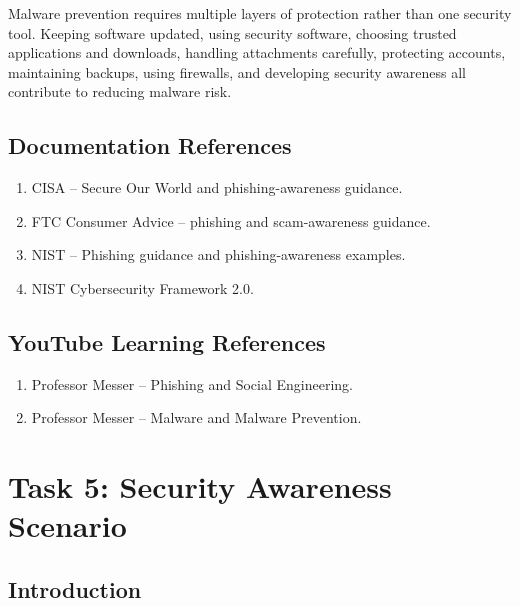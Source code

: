 \documentclass[12pt,a4paper]{article}
\begin{document}
Malware prevention requires multiple layers of protection rather than
one security tool. Keeping software updated, using security software,
choosing trusted applications and downloads, handling attachments
carefully, protecting accounts, maintaining backups, using firewalls,
and developing security awareness all contribute to reducing malware
risk.


\Needspace{5cm}
\subsection{Documentation References}

\begin{enumerate}
    \item CISA -- Secure Our World and phishing-awareness guidance.
    \item FTC Consumer Advice -- phishing and scam-awareness guidance.
    \item NIST -- Phishing guidance and phishing-awareness examples.
    \item NIST Cybersecurity Framework 2.0.
\end{enumerate}

\Needspace{4cm}
\subsection{YouTube Learning References}

\begin{enumerate}
    \item Professor Messer -- Phishing and Social Engineering.
    \item Professor Messer -- Malware and Malware Prevention.
\end{enumerate}



\section{Task 5: Security Awareness Scenario}

\subsection{Introduction}
\end{document}
